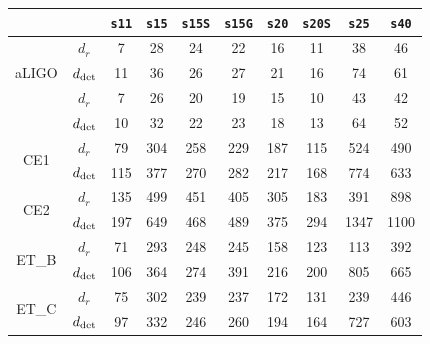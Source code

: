 \begin{table}
  \centering
  \begin{tabular}{c|c|cccccccc}

\multicolumn{2}{c|}{}  & \texttt{s11} & \texttt{s15} & \texttt{s15S} & \texttt{s15G} & \texttt{s20} & \texttt{s20S} & \texttt{s25}  & \texttt{s40}\\   

\hline
\multirow{3}{*}{aLIGO} & $d_{r}$   & 7 & 28 & 24  & 22 & 16 & 11 & 38 & 46 \\
\cline{2-10}
                       & $d_{\rm det}$ & 11 & 36 & 26 & 27 & 21 & 16 & 74 & 61\\

\hline
\hline
\multirow{3}{*}{AdV}   & $d_{r}$   & 7  & 26  & 20 & 19 & 15 & 10 & 43 & 42 \\
\cline{2-10}
                       & $d_{\rm det}$ &  10 & 32 & 22 & 23 & 18 & 13 & 64 & 52\\

\hline
\hline
\multirow{2}{*}{CE1}   & $d_{r}$   & 79  & 304 & 258 & 229 & 187 & 115 & 524 & 490 \\
\cline{2-10}
                       & $d_{\rm det}$ & 115 & 377 & 270 & 282 & 217 & 168 & 774  & 633\\

\hline
\multirow{2}{*}{CE2}   & $d_{r}$  & 135 & 499 & 451 & 405 & 305 & 183 & 391 & 898 \\
\cline{2-10}
                       & $d_{\rm det}$ & 197 & 649 & 468 & 489 & 375 & 294 & 1347  & 1100\\

\hline
\multirow{2}{*}{ET\_B} & $d_{r}$ & 71  & 293 & 248 & 245 & 158 & 123 & 113 & 392 \\
\cline{2-10}
                       & $d_{\rm det}$ & 106 & 364 & 274 & 391 & 216 & 200 & 805 & 665\\

\hline
\multirow{2}{*}{ET\_C} & $d_{r}$ & 75  & 302 & 239 & 237 & 172 & 131 & 239 & 446 \\
\cline{2-10}
                       & $d_{\rm det}$ & 97 & 332 & 246 & 260 & 194 & 164 & 727  & 603\\


\end{tabular}
\end{table}

